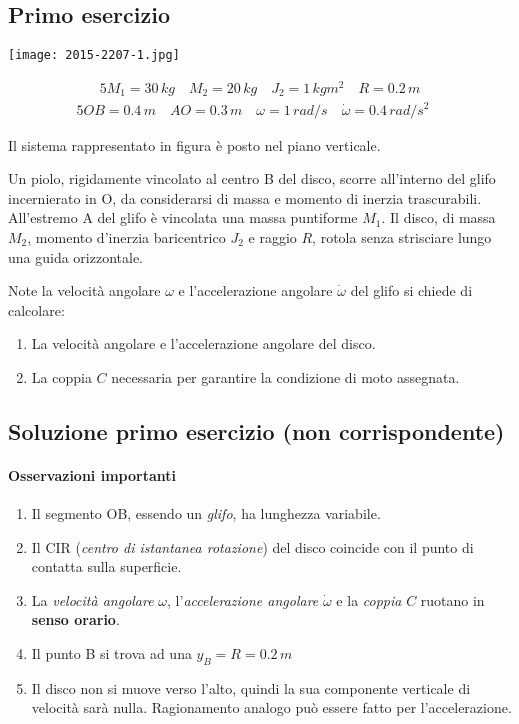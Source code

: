 \documentclass[main.tex]{subfiles}
\begin{document}
\subsection{Primo esercizio}

 \texttt{[image: 2015-2207-1.jpg]}

\begin{alignat*}{5}
	M_1 = 30\,kg \quad
	M_2 = 20\,kg \quad
	J_2 = 1\,kg m^2 \quad
	R = 0.2\,m
\end{alignat*}
\begin{alignat*}{5}
	OB = 0.4\,m\quad
	AO = 0.3\,m\quad
	\omega = 1\,rad/s\quad
	\dot{\omega}=0.4\,rad/s^2\quad
\end{alignat*}


Il sistema rappresentato in figura è posto nel piano verticale.

Un piolo, rigidamente vincolato al centro B del disco, scorre all’interno del glifo incernierato in O, da considerarsi di massa e momento di inerzia trascurabili. All’estremo A del glifo è vincolata una massa puntiforme $M_1$. Il disco, di massa $M_2$, momento d’inerzia baricentrico $J_2$ e raggio $R$, rotola senza strisciare lungo una guida orizzontale.

Note la velocità angolare $\omega$ e l’accelerazione angolare $\dot{\omega}$ del glifo si chiede di calcolare:

\begin{enumerate}
	\item La velocità angolare e l’accelerazione angolare del disco.
	\item La coppia $C$ necessaria per garantire la condizione di moto assegnata.
\end{enumerate}

\clearpage

\subsection{Soluzione primo esercizio (non corrispondente)}

\paragraph{Osservazioni importanti}

\begin{enumerate}
	\item Il segmento OB, essendo un \textit{glifo}, ha lunghezza variabile.
	\item Il CIR (\textit{centro di istantanea rotazione}) del disco coincide con il punto di contatta sulla superficie.
	\item La \textit{velocità angolare} $\omega$, l'\textit{accelerazione angolare} $\dot{\omega}$ e la \textit{coppia} $C$ ruotano in \textbf{senso orario}.
	\item Il punto B si trova ad una $y_B = R = 0.2\,m$
	\item Il disco non si muove verso l'alto, quindi la sua componente verticale di velocità sarà nulla. Ragionamento analogo può essere fatto per l'accelerazione.
\end{enumerate}
\end{document}
